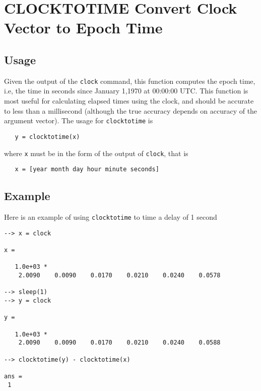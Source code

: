 \section{CLOCKTOTIME Convert Clock Vector to Epoch Time}

\subsection{Usage}

Given the output of the \verb|clock| command, this function computes
the epoch time, i.e, the time in seconds since January 1,1970 
at 00:00:00 UTC.  This function is most useful for calculating elapsed
times using the clock, and should be accurate to less than a millisecond
(although the true accuracy depends on accuracy of the argument vector). 
The usage for \verb|clocktotime| is
\begin{verbatim}
   y = clocktotime(x)
\end{verbatim}
where \verb|x| must be in the form of the output of \verb|clock|, that is
\begin{verbatim}
   x = [year month day hour minute seconds]
\end{verbatim}
\subsection{Example}

Here is an example of using \verb|clocktotime| to time a delay of 1 second
\begin{verbatim}
--> x = clock

x = 

   1.0e+03 * 
    2.0090    0.0090    0.0170    0.0210    0.0240    0.0578 

--> sleep(1)
--> y = clock

y = 

   1.0e+03 * 
    2.0090    0.0090    0.0170    0.0210    0.0240    0.0588 

--> clocktotime(y) - clocktotime(x)

ans = 
 1 
\end{verbatim}
